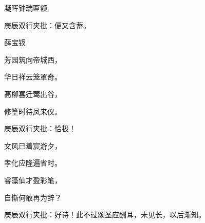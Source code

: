 \begin{poem}
    \begin{pl}凝晖钟瑞匾额      \end{pl}
    \begin{note}庚辰双行夹批：便又含蓄。\end{note} \begin{pl}薛宝钗\end{pl}

    \begin{pl}芳园筑向帝城西，\end{pl}

    \begin{pl}华日祥云笼罩奇。\end{pl}

    \begin{pl}高柳喜迁莺出谷，\end{pl}

    \begin{pl}修篁时待凤来仪。    \end{pl}
    \begin{note}庚辰双行夹批：恰极！\end{note}

    \begin{pl}文风已着宸游夕，\end{pl}

    \begin{pl}孝化应隆遍省时。\end{pl}

    \begin{pl}睿藻仙才盈彩笔，\end{pl}

    \begin{pl}自惭何敢再为辞？    \end{pl}
    \begin{note}庚辰双行夹批：好诗！此不过颂圣应酬耳，未见长，以后渐知。\end{note}

\end{poem}

